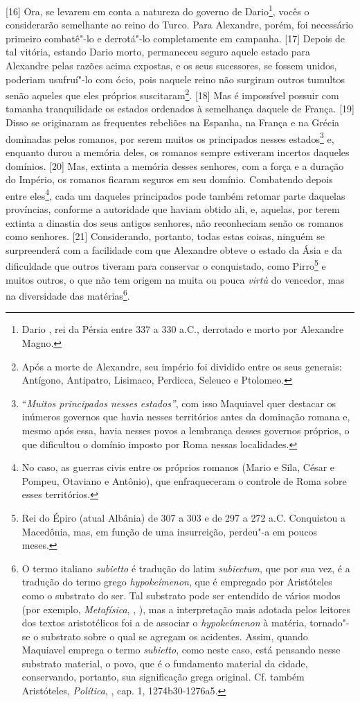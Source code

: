 {[}16{]} Ora, se levarem em conta a natureza do governo de
Dario\footnote{Dario , rei da Pérsia entre 337 a 330 a.C., derrotado
  e morto por Alexandre Magno.}, vocês o considerarão semelhante ao
reino do Turco. Para Alexandre, porém, foi necessário primeiro
combatê"-lo e derrotá"-lo completamente em campanha. {[}17{]} Depois de
tal vitória, estando Dario morto, permaneceu seguro aquele estado para
Alexandre pelas razões acima expostas, e os seus sucessores, se fossem
unidos, poderiam usufruí"-lo com ócio, pois naquele reino não surgiram
outros tumultos senão aqueles que eles próprios suscitaram\footnote{Após
  a morte de Alexandre, seu império foi dividido entre os seus generais:
  Antígono, Antipatro, Lisimaco, Perdicca, Seleuco e Ptolomeo.}.
{[}18{]} Mas é impossível possuir com tamanha tranquilidade os estados
ordenados à semelhança daquele de França. {[}19{]} Disso se originaram
as frequentes rebeliões na Espanha, na França e na Grécia dominadas
pelos romanos, por serem muitos os principados nesses estados\footnote{``\emph{Muitos
  principados nesses estados''}, com isso Maquiavel quer destacar os
  inúmeros governos que havia nesses territórios antes da dominação
  romana e, mesmo após essa, havia nesses povos a lembrança desses
  governos próprios, o que dificultou o domínio imposto por Roma nessas
  localidades.} e, enquanto durou a memória deles, os romanos sempre
estiveram incertos daqueles domínios. {[}20{]} Mas, extinta a memória
desses senhores, com a força e a duração do Império, os romanos ficaram
seguros em seu domínio. Combatendo depois entre eles\footnote{No caso,
  as guerras civis entre os próprios romanos (Mario e Sila, César e
  Pompeu, Otaviano e Antônio), que enfraqueceram o controle de Roma
  sobre esses territórios.}, cada um daqueles principados pode também
retomar parte daquelas províncias, conforme a autoridade que haviam
obtido ali, e, aquelas, por terem extinta a dinastia dos seus antigos
senhores, não reconheciam senão os romanos como senhores. {[}21{]}
Considerando, portanto, todas estas coisas, ninguém se surpreenderá com
a facilidade com que Alexandre obteve o estado da Ásia e da dificuldade
que outros tiveram para conservar o conquistado, como Pirro\footnote{Rei
  do Épiro (atual Albânia) de 307 a 303 e de 297 a 272 a.C. Conquistou a
  Macedônia, mas, em função de uma insurreição, perdeu"-a em poucos meses.} e muitos outros,
o que não tem origem na muita ou pouca \emph{virtù} do vencedor, mas na
diversidade das matérias\footnote{O termo italiano \emph{subietto} é
  tradução do latim \emph{subiectum}, que por sua vez, é a tradução do
  termo grego \emph{hypokeímenon}, que é empregado por Aristóteles como
  o substrato do ser. Tal substrato pode ser entendido de vários modos
  (por exemplo, \emph{Metafísica}, , ), mas a interpretação mais
  adotada pelos leitores dos textos aristotélicos foi a de associar o
  \emph{hypokeímenon} à matéria, tornado"-se o substrato sobre o qual se
  agregam os acidentes. Assim, quando Maquiavel emprega o termo
  \emph{subietto}, como neste caso, está pensando nesse substrato
  material, o povo, que é o fundamento material da cidade, conservando,
  portanto, sua significação grega original. Cf. também Aristóteles,
  \emph{Política}, , cap. 1, 1274b30-1276a5.}.

